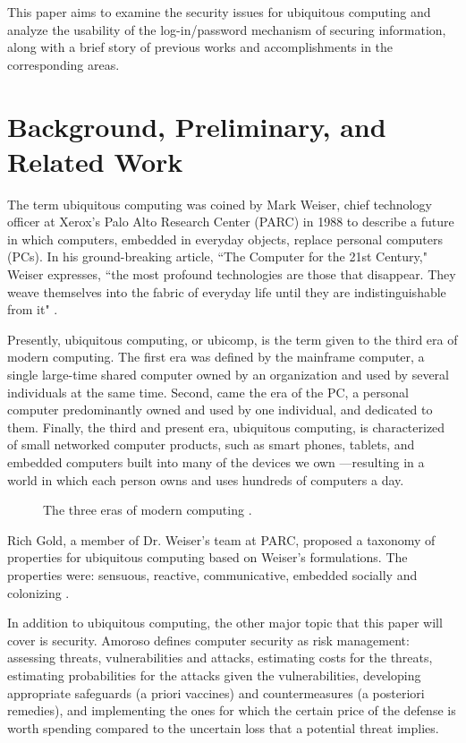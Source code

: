 \documentclass{article}
\begin{document}
This paper aims to examine the security issues for ubiquitous computing and analyze the usability of the log-in/password mechanism of securing information, along with a brief story of previous works and accomplishments in the corresponding areas. 

\section{Background, Preliminary, and Related Work}
The term ubiquitous computing was coined by Mark Weiser, chief technology officer at Xerox's Palo Alto Research Center (PARC) in 1988 to describe a future in which computers, embedded in everyday objects, replace personal computers (PCs). In his ground-breaking article, ``The Computer for the 21st Century," Weiser expresses, ``the most profound technologies are those that disappear. They weave themselves into the fabric of everyday life until they are indistinguishable from it" \cite{weiser1991computer}.

Presently, ubiquitous computing, or ubicomp, is the term given to the third era of modern computing. The first era was defined by the mainframe computer, a single large-time shared computer owned by an organization and used by several individuals at the same time. Second, came the era of the PC, a personal computer predominantly owned and used by one individual, and dedicated to them. Finally, the third and present era, ubiquitous computing, is characterized of small networked computer products, such as smart phones, tablets, and embedded computers built into many of the devices we own ---resulting in a world in which each person owns and uses hundreds of computers a day.

\begin{figure}
  \centering
  \caption{The three eras of modern computing \cite{weiser1991computer}.}
\end{figure}


Rich Gold, a member of Dr. Weiser's team at PARC, proposed a taxonomy of properties for ubiquitous computing based on Weiser's formulations. The properties were: sensuous, reactive, communicative, embedded socially and colonizing \cite{gold2007plenitude}. 

In addition to ubiquitous computing, the other major topic that this paper will cover is security. Amoroso\cite{amoroso1994fundamentals} defines computer security as risk management: assessing threats, vulnerabilities and attacks, estimating costs for the threats, estimating probabilities for the attacks given the vulnerabilities, developing appropriate safeguards (a priori vaccines) and countermeasures (a posteriori remedies), and implementing the ones for which the certain price of the defense is worth spending compared to the uncertain loss that a potential threat implies. 
\end{document}
